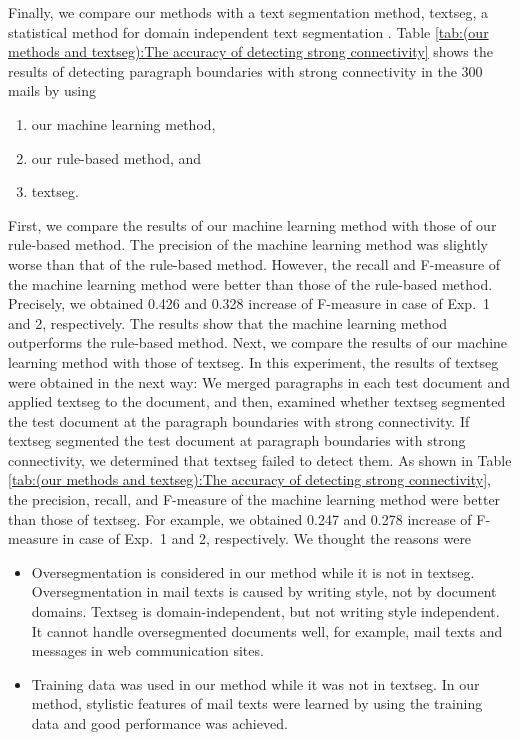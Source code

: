 \documentclass[english]{jnlp_1.4}
\begin{document}
Finally, 
we compare our methods with a text segmentation method, 
textseg, 
a statistical method for domain independent text segmentation
\cite{proc:utiyama2001}.
Table \ref{tab:(our methods and textseg):The accuracy of detecting strong connectivity} shows 
the results of detecting paragraph boundaries with strong connectivity 
in the 300 mails 
by using  
\pagebreak
\begin{enumerate}
 \item our machine learning method, 
 \item our rule-based method, and 
 \item textseg.
\end{enumerate}
First, 
we compare the results of our machine learning method with 
those of our rule-based method.
The precision of the machine learning method was slightly worse than 
that of the rule-based method. 
However, 
the recall and F-measure of the machine learning method were better 
than those of the rule-based method.
Precisely, 
we obtained 
0.426 
and 
0.328 
increase of F-measure 
in case of Exp.~1 and 2, respectively.
The results show that 
the machine learning method outperforms 
the rule-based method.
Next, 
we compare the results of our machine learning method with those of textseg.
In this experiment, 
the results of textseg were obtained in the next way:
We merged paragraphs in each test document and applied textseg to the document, 
and then, 
examined whether textseg segmented the test document 
at the paragraph boundaries with strong connectivity.
If textseg segmented the test document at paragraph boundaries with strong connectivity, 
we determined that textseg failed to detect them.
As shown in 
Table \ref{tab:(our methods and textseg):The accuracy of detecting strong connectivity}, 
the precision, recall, and F-measure of the machine learning method were better 
than those of textseg.
For example, 
we obtained 
0.247 
and 
0.278 
increase of F-measure 
in case of Exp.~1 and 2, respectively.
We thought the reasons were
\begin{itemize}
 \item Oversegmentation is considered in our method
       while it is not in textseg.
       Oversegmentation in mail texts is caused by writing style, 
       not by document domains.
       Textseg is domain-independent, 
       but not writing style independent.
       It cannot handle oversegmented documents well, 
       for example, 
       mail texts and messages in web communication sites.

 \item Training data was used in our method 
       while it was not in textseg.
       In our method, 
       stylistic features of mail texts were learned by using the training data
       and good performance was achieved.

\end{itemize}
\end{document}
